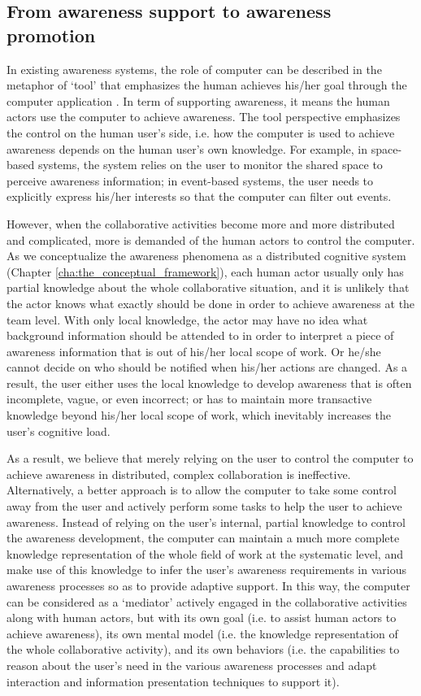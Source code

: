 \subsection{From awareness support to awareness promotion} %
\label{sub:from_awareness_support_to_awareness_promotion}
In existing awareness systems, the role of computer can be described in the metaphor of `tool' that emphasizes the human achieves his/her goal through the computer application \cite{Bodker1997}. In term of supporting awareness, it means the human actors use the computer to achieve awareness. The tool perspective emphasizes the control on the human user's side, i.e. how the computer is used to achieve awareness depends on the human user's own knowledge. For example, in space-based systems, the system relies on the user to monitor the shared space to perceive awareness information; in event-based systems, the user needs to explicitly express his/her interests so that the computer can filter out events. 

However, when the collaborative activities become more and more distributed and complicated, more is demanded of the human actors to control the computer. As we conceptualize the awareness phenomena as a distributed cognitive system (Chapter \ref{cha:the_conceptual_framework}), each human actor usually only has partial knowledge about the whole collaborative situation, and it is unlikely that the actor knows what exactly should be done in order to achieve awareness at the team level. With only local knowledge, the actor may have no idea what background information should be attended to in order to interpret a piece of awareness information that is out of his/her local scope of work. Or he/she cannot decide on who should be notified when his/her actions are changed. As a result, the user either uses the local knowledge to develop awareness that is often incomplete, vague, or even incorrect; or has to maintain more transactive knowledge beyond his/her local scope of work, which inevitably increases the user's cognitive load. 

As a result, we believe that merely relying on the user to control the computer to achieve awareness in distributed, complex collaboration is ineffective. Alternatively, a better approach is to allow the computer to take some control away from the user and actively perform some tasks to help the user to achieve awareness. Instead of relying on the user's internal, partial knowledge to control the awareness development, the computer can maintain a much more complete knowledge representation of the whole field of work at the systematic level, and make use of this knowledge to infer the user's awareness requirements in various awareness processes so as to provide adaptive support. In this way, the computer can be considered as a `mediator' actively engaged in the collaborative activities along with human actors, but with its own goal (i.e. to assist human actors to achieve awareness), its own mental model (i.e. the knowledge representation of the whole collaborative activity), and its own behaviors (i.e. the capabilities to reason about the user's need in the various awareness processes and adapt interaction and information presentation techniques to support it).

